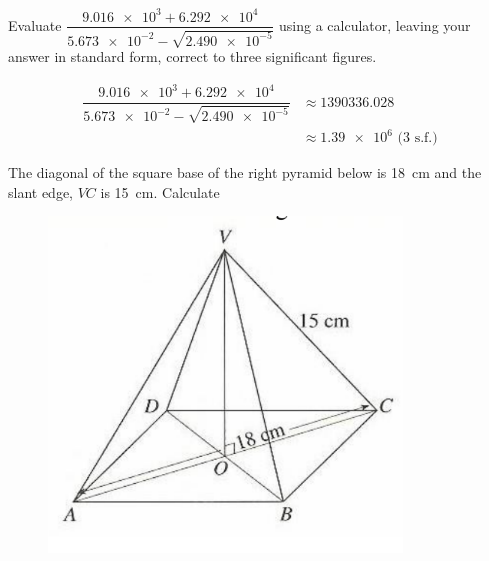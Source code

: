 \documentclass[12pt, answers]{exam}
\renewcommand{\half}{\dfrac{1}{2}}
\newcommand{\third}{\dfrac{1}{3}}
\newcommand{\cm}{\centi\metre}
\begin{document}
\begin{questions}
\question Evaluate $\dfrac{\num{9.016e3} + \num{6.292e4}}{\num{5.673e-2} - \sqrt{\num{2.490e-5}}}$ using a calculator,
leaving your answer in standard form, correct to three significant figures.
\begin{solution}
\begin{align*}
    \dfrac{\num{9.016e3} + \num{6.292e4}}{\num{5.673e-2} - \sqrt{\num{2.490e-5}}} &\approx \num{1390336.028} \\
    &\approx \num{1.39e6} \text{ (3 s.f.)}
\end{align*}
\end{solution}

\question The diagonal of the square base of the right pyramid below is \qty{18}{\cm} and the slant edge, $VC$ is \qty{15}{\cm}.
Calculate
\begin{figure}[htpb]
    \centering
    \includegraphics{pyrq8.png}
    \label{fig:q8}
\end{figure}



\end{questions}
\end{document}
